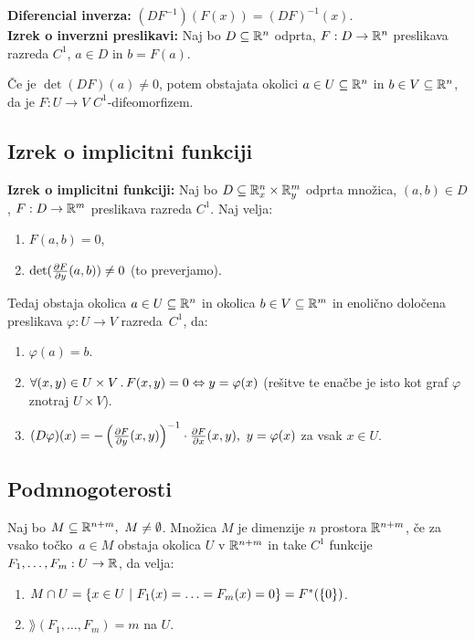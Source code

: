 \textbf{Diferencial inverza:} $(DF^{-1})(F(x)) = (DF)^{-1}(x)$. \\
\textbf{Izrek o inverzni preslikavi:} Naj bo $D \subseteq \mathbb{R}^n$ odprta, $F: D \to \mathbb{R}^n$ preslikava razreda $C^1$,  $a \in D$ in $b = F(a)$.


Če je $\det(DF)(a) \neq 0$, potem obstajata okolici $a \in U \subseteq \mathbb{R}^n$ in $b \in V \subseteq \mathbb{R}^n$, da je $F: U \to V$ $C^1$-difeomorfizem.

\subsection*{Izrek o implicitni funkciji}
\textbf{Izrek o implicitni funkciji:} Naj bo $D\subseteq \mathbb{R}_x^n \times \mathbb{R}_y^m$ odprta množica, $(a, b) \in D$, $F: D \to \mathbb{R}^m$ preslikava razreda $C^1$. Naj velja:
\begin{enumerate}
    \item $F(a, b) = 0$,
    \item $\det(\frac{\partial F}{\partial y}(a,b)) \neq 0$ (to preverjamo).
\end{enumerate}
Tedaj obstaja okolica $a \in U \subseteq \mathbb{R}^n$ in okolica $b \in V \subseteq \mathbb{R}^m$ in enolično določena preslikava $\varphi: U \to V$ razreda~$C^1$, da:
\begin{enumerate}
    \item $\varphi(a) = b$.
    \item $\forall (x,y) \in U \times V \,.\, F(x,y) = 0 \Leftrightarrow y = \varphi(x)$ (rešitve te enačbe je isto kot graf $\varphi$ znotraj $U \times V$).
    \item $(D \varphi)(x) = - \left(\frac{\partial F}{\partial y}(x,y)\right)^{-1} \cdot \frac{\partial F}{\partial x}(x,y), \ y = \varphi(x)$ za vsak $x \in U$.
\end{enumerate}

\subsection*{Podmnogoterosti}
Naj bo $M \subseteq \mathbb{R}^{n+m}, \ M \neq \emptyset$. Množica $M$ je  dimenzije $n$ prostora $\mathbb{R}^{n+m}$, če za vsako točko~$a \in M$ obstaja okolica $U$ v $\mathbb{R}^{n+m}$ in take $C^1$ funkcije $F_1, \ldots, F_m: U \to \mathbb{R}$, da velja:
\begin{enumerate}
    \item $M \cap U = \left\{x \in U \ | \ F_1(x) = \ldots = F_m(x) = 0\right\} = F^*(\left\{0\right\})$.
    \item $\rang(F_1, \ldots, F_m) = m$ na $U$.
\end{enumerate}

